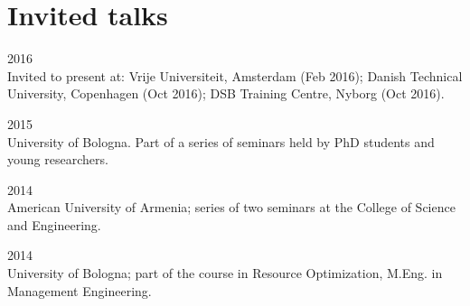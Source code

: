 \section*{Invited talks}

\begin{paracol}{2}
  \textsc{2016}
\switchcolumn
  \\
  Invited to present at: Vrije Universiteit, Amsterdam (Feb 2016); Danish Technical University, Copenhagen (Oct 2016); DSB Training Centre, Nyborg (Oct 2016).
\end{paracol}

\begin{paracol}{2}
  \textsc{2015}
\switchcolumn
  \\
  University of Bologna. Part of a series of seminars held by PhD students and young researchers.
\end{paracol}

\begin{paracol}{2}
  \textsc{2014}
\switchcolumn
  \\
  American University of Armenia; series of two seminars at the College of Science and Engineering.
\end{paracol}

\begin{paracol}{2}
  \textsc{2014}
\switchcolumn
  \\
  University of Bologna; part of the course in Resource Optimization, M.Eng. in Management Engineering.
\end{paracol}
